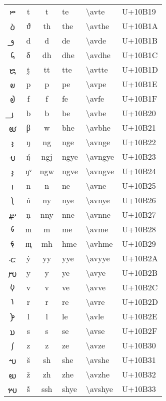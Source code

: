 \documentclass{article}
\begin{document}
{\begin{longtable}{ccclll}
{\avfont 𐬙 } &t &t &te &\textbackslash avte &U+10B19 \\
{\avfont 𐬚 } &ϑ &th &the &\textbackslash avthe &U+10B1A \\
{\avfont 𐬛 } &d &d &de &\textbackslash avde &U+10B1B \\
{\avfont 𐬜 } &δ &dh &dhe &\textbackslash avdhe &U+10B1C \\
{\avfont 𐬝 } &t̰ &tt &tte &\textbackslash avtte &U+10B1D \\
{\avfont 𐬞 } &p &p &pe &\textbackslash avpe &U+10B1E \\
{\avfont 𐬟 } &f &f &fe &\textbackslash avfe &U+10B1F \\
{\avfont 𐬠 } &b &b &be &\textbackslash avbe &U+10B20 \\
{\avfont 𐬡 } &β &w &bhe &\textbackslash avbhe &U+10B21 \\
{\avfont 𐬢 } &ŋ &ng &nge &\textbackslash avnge &U+10B22 \\
{\avfont 𐬣 } &ŋ́ &ngj &ngye &\textbackslash avngye &U+10B23 \\
{\avfont 𐬤 } &ŋᵛ &ngw &ngve &\textbackslash avngve &U+10B24 \\
{\avfont 𐬥 } &n &n &ne &\textbackslash avne &U+10B25 \\
{\avfont 𐬦 } &ń &ny &nye &\textbackslash avnye &U+10B26 \\
{\avfont 𐬧 } &ṇ &nny &nne &\textbackslash avnne &U+10B27 \\
{\avfont 𐬨 } &m &m &me &\textbackslash avme &U+10B28 \\
{\avfont 𐬩 } &m̨ &mh &hme &\textbackslash avhme &U+10B29 \\
{\avfont 𐬪 } &ẏ &yy &yye &\textbackslash avyye &U+10B2A \\
{\avfont 𐬫 } &y &y &ye &\textbackslash avye &U+10B2B \\
{\avfont 𐬬 } &v &v &ve &\textbackslash avve &U+10B2C \\
{\avfont 𐬭 } &r &r &re &\textbackslash avre &U+10B2D \\
{\avfont 𐬮 } &l &l &le &\textbackslash avle &U+10B2E \\
{\avfont 𐬯 } &s &s &se &\textbackslash avse &U+10B2F \\
{\avfont 𐬰 } &z &z &ze &\textbackslash avze &U+10B30 \\
{\avfont 𐬱 } &š &sh &she &\textbackslash avshe &U+10B31 \\
{\avfont 𐬲 } &ž &zh &zhe &\textbackslash avzhe &U+10B32 \\
{\avfont 𐬳 } &š́ &ssh &shye &\textbackslash avshye &U+10B33 \\

\end{longtable}}
\end{document}
